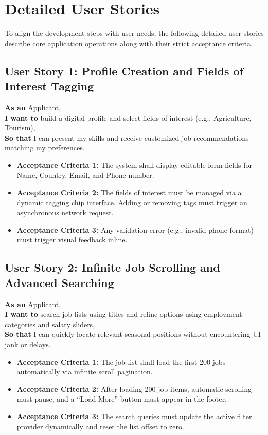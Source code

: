 \section{Detailed User Stories}
To align the development steps with user needs, the following detailed user stories describe core application operations along with their strict acceptance criteria.

\subsection{User Story 1: Profile Creation and Fields of Interest Tagging}
\textbf{As an} Applicant,\\
\textbf{I want to} build a digital profile and select fields of interest (e.g., Agriculture, Tourism),\\
\textbf{So that} I can present my skills and receive customized job recommendations matching my preferences.
\begin{itemize}
    \item \textbf{Acceptance Criteria 1:} The system shall display editable form fields for Name, Country, Email, and Phone number.
    \item \textbf{Acceptance Criteria 2:} The fields of interest must be managed via a dynamic tagging chip interface. Adding or removing tags must trigger an asynchronous network request.
    \item \textbf{Acceptance Criteria 3:} Any validation error (e.g., invalid phone format) must trigger visual feedback inline.
\end{itemize}

\subsection{User Story 2: Infinite Job Scrolling and Advanced Searching}
\textbf{As an} Applicant,\\
\textbf{I want to} search job lists using titles and refine options using employment categories and salary sliders,\\
\textbf{So that} I can quickly locate relevant seasonal positions without encountering UI jank or delays.
\begin{itemize}
    \item \textbf{Acceptance Criteria 1:} The job list shall load the first 200 jobs automatically via infinite scroll pagination.
    \item \textbf{Acceptance Criteria 2:} After loading 200 job items, automatic scrolling must pause, and a ``Load More'' button must appear in the footer.
    \item \textbf{Acceptance Criteria 3:} The search queries must update the active filter provider dynamically and reset the list offset to zero.
\end{itemize}


